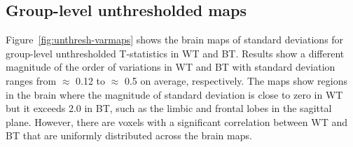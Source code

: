 \documentclass[conference]{IEEEtran}
\begin{document}



\subsection{Group-level unthresholded maps}

Figure~\ref{fig:unthresh-varmaps} shows the brain maps of standard deviations for group-level unthresholded T-statistics in WT and BT.
Results show a different magnitude of
the order of variations in WT and BT with standard deviation ranges from $\approx$ 0.12 to $\approx$ 0.5 on average, respectively.
The maps show regions in the brain where the magnitude of standard deviation is close to zero in WT but it exceeds 2.0 in BT,
such as the limbic and frontal lobes in the sagittal plane.
However, there are voxels with a significant correlation between WT and BT that are uniformly distributed across the brain maps.


\begin{figure}[b]
  \end{figure}
  
\end{document}
